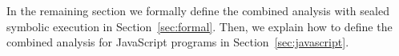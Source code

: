 %

In the remaining section we formally define the combined analysis with sealed
symbolic execution in Section~\ref{sec:formal}.  Then, we explain how to define
the combined analysis for JavaScript programs in Section~\ref{sec:javascript}.

